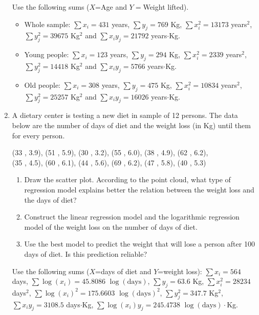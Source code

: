 \begin{enumerate}[leftmargin=*,resume]
Use the following sums ($X$=Age and $Y=$Weight lifted).
\begin{itemize}[label=--]
\item Whole sample: $\sum x_i=431$ years, $\sum y_j=769$ Kg, $\sum x_i^2=13173$ years$^2$, $\sum y_j^2=39675$
Kg$^2$ and $\sum x_iy_j=21792$ years$\cdot$Kg.
\item Young people: $\sum x_i=123$ years, $\sum y_j=294$ Kg, $\sum x_i^2=2339$ years$^2$, $\sum y_j^2=14418$
Kg$^2$ and $\sum x_iy_j=5766$ years$\cdot$Kg.
\item Old people: $\sum x_i=308$ years, $\sum y_j=475$ Kg, $\sum x_i^2=10834$ years$^2$, $\sum y_j^2=25257$
Kg$^2$ and $\sum x_iy_j=16026$ years$\cdot$Kg.
\end{itemize}

\item A dietary center is testing a new diet in sample of 12 persons. 
The data below are the number of days of diet and the weight loss (in Kg) until them for every person.  
\begin{center}
(33 , 3.9), (51 , 5.9), (30 , 3.2), (55 , 6.0), (38 , 4.9), (62 , 6.2),\\
(35 , 4.5), (60 , 6.1), (44 , 5.6), (69 , 6.2), (47 , 5.8), (40 , 5.3)
\end{center}
\begin{enumerate}
\item Draw the scatter plot. According to the point cloud, what type of regression model explains better the relation
between the weight loss and the days of diet?
\item Construct the linear regression model and the logarithmic regression model of the weight loss on the number of
days of diet.
\item Use the best model to predict the weight that will lose a person after 100 days of diet. 
Is this prediction reliable?
\end{enumerate}
Use the following sums ($X$=days of diet and $Y$=weight loss): $\sum x_i=564$ days, $\sum \log(x_i)=45.8086$
$\log(\mbox{days})$, $\sum y_j=63.6$ Kg, $\sum x_i^2=28234$ days$^2$, $\sum \log(x_i)^2=175.6603$ $\log(\mbox{days})^2$, 
$\sum y_j^2=347.7$ Kg$^2$, $\sum x_iy_j=3108.5$ days$\cdot$Kg, $\sum \log(x_i)y_j=245.4738$ $\log(\mbox{days})\cdot$Kg.


\end{enumerate}
